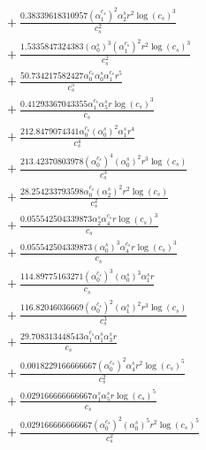 \documentclass[10pt]{article}
\begin{document}
\begin{align*}
&{}  + \frac{0.38339618310957 \left(\alpha_{1}^{c_s}\right)^{2} \alpha_{2}^s r^{2} \log{\left(c_{s} \right)}^{3}}{c_{s}^{2}} \\
&{}  + \frac{1.5335847324383 \left(\alpha_{0}^s\right)^{3} \left(\alpha_{1}^{c_s}\right)^{2} r^{2} \log{\left(c_{s} \right)}^{3}}{c_{s}^{2}} \\
&{}  + \frac{50.734217582427 \alpha_{0}^{c_s} \alpha_{0}^s \alpha_{1}^{c_s} r^{5}}{c_{s}^{5}} \\
&{}  + \frac{0.41293367043355 \alpha_{1}^{c_s} \alpha_{5}^s r \log{\left(c_{s} \right)}^{3}}{c_{s}} \\
&{}  + \frac{212.8479074341 \alpha_{0}^{c_s} \left(\alpha_{0}^s\right)^{2} \alpha_{1}^s r^{4}}{c_{s}^{4}} \\
&{}  + \frac{213.42370803978 \left(\alpha_{0}^{c_s}\right)^{4} \left(\alpha_{0}^s\right)^{2} r^{3} \log{\left(c_{s} \right)}}{c_{s}^{3}} \\
&{}  + \frac{28.254233793598 \alpha_{0}^{c_s} \left(\alpha_{2}^s\right)^{2} r^{2} \log{\left(c_{s} \right)}}{c_{s}^{2}} \\
&{}  + \frac{0.055542504339873 \alpha_{2}^s \alpha_{4}^{c_s} r \log{\left(c_{s} \right)}^{3}}{c_{s}} \\
&{}  + \frac{0.055542504339873 \left(\alpha_{0}^s\right)^{3} \alpha_{4}^{c_s} r \log{\left(c_{s} \right)}^{3}}{c_{s}} \\
&{}  + \frac{114.89775163271 \left(\alpha_{0}^{c_s}\right)^{3} \left(\alpha_{0}^s\right)^{3} \alpha_{1}^s r}{c_{s}} \\
&{}  + \frac{116.82046036669 \left(\alpha_{0}^{c_s}\right)^{2} \left(\alpha_{1}^s\right)^{2} r^{3} \log{\left(c_{s} \right)}}{c_{s}^{3}} \\
&{}  + \frac{29.708313448543 \alpha_{1}^{c_s} \alpha_{1}^s \alpha_{3}^s r}{c_{s}} \\
&{}  + \frac{0.0018229166666667 \left(\alpha_{0}^{c_s}\right)^{2} \alpha_{4}^s r^{2} \log{\left(c_{s} \right)}^{5}}{c_{s}^{2}} \\
&{}  + \frac{0.029166666666667 \alpha_{1}^s \alpha_{5}^s r \log{\left(c_{s} \right)}^{5}}{c_{s}} \\
&{}  + \frac{0.029166666666667 \left(\alpha_{0}^{c_s}\right)^{2} \left(\alpha_{0}^s\right)^{5} r^{2} \log{\left(c_{s} \right)}^{5}}{c_{s}^{2}}
\end{align*}
\end{document}
